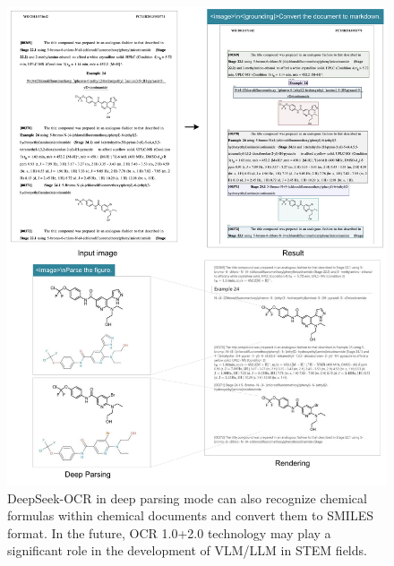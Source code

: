 \documentclass[11pt, a4paper, logo, copyright, nonumbering]{deepseek}
\begin{document}
\begin{CJK*}{UTF8}{gbsn}
\begin{figure}[p]
	\centering
    \includegraphics[width=1.0\linewidth]{figures/8.pdf}
	\caption{DeepSeek-OCR in deep parsing mode can also recognize chemical formulas within chemical documents and convert them to SMILES format. In the future, OCR 1.0+2.0 technology may play a significant role in the development of VLM/LLM in STEM fields. }
	\label{fig:13}
\end{figure}

\newpage


\end{CJK*}
\end{document}
